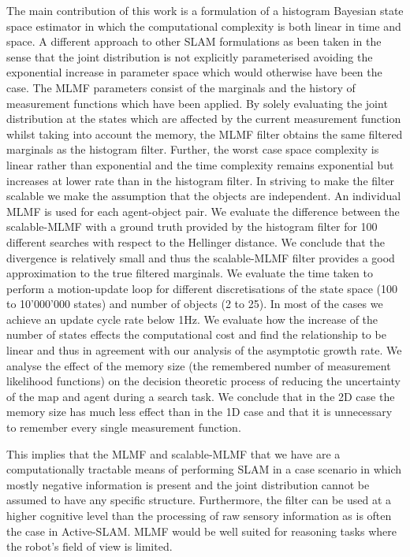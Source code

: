 The main contribution of this work is a formulation of a histogram Bayesian state space estimator in which the computational complexity is 
both linear in time and space. A different approach to other SLAM formulations as been taken in the sense that
the joint distribution is not explicitly parameterised avoiding the exponential increase in parameter space which would otherwise have been the case. 
The MLMF parameters consist of the marginals and the history of measurement functions which have been applied. By solely evaluating the joint 
distribution at the states which are affected by the current measurement function whilst taking into account the 
memory, the MLMF filter obtains the same filtered marginals as the histogram filter. Further, the worst case space complexity is 
linear rather than exponential and the time complexity remains exponential but increases at lower rate than in the histogram filter.
In striving to make the filter scalable we make the assumption that the objects are independent. An individual MLMF
is used for each agent-object pair. We evaluate the difference between the scalable-MLMF with a ground truth provided 
by the histogram filter for 100 different searches with respect to the Hellinger distance. We conclude that 
the divergence is relatively small and thus the scalable-MLMF filter provides a good approximation to the true filtered
marginals. We evaluate the time taken to perform a motion-update loop for different discretisations of the state 
space (100 to 10'000'000 states) and number of objects (2 to 25). In most of the cases we achieve an update cycle rate below 1Hz. 
We evaluate how the increase of the number of states effects the computational cost and find  the relationship to be linear and thus 
in agreement with our analysis of the asymptotic growth rate. We analyse the effect of the memory size 
(the remembered number of measurement likelihood functions) on the decision theoretic process of reducing 
the uncertainty of the map and agent during a search task. 
We conclude that in the 2D case the memory size has much less effect than in the 1D case and that it 
is unnecessary to remember every single measurement function.

This implies that the MLMF and scalable-MLMF that we have are a computationally tractable means of 
performing SLAM in a case scenario in which mostly negative information is present and the 
joint distribution cannot be assumed to have any specific structure. Furthermore, the filter can be used at a higher cognitive level than 
the processing of raw sensory information as is often the case in Active-SLAM. MLMF would be well suited for reasoning tasks 
where the robot's field of view is limited.

